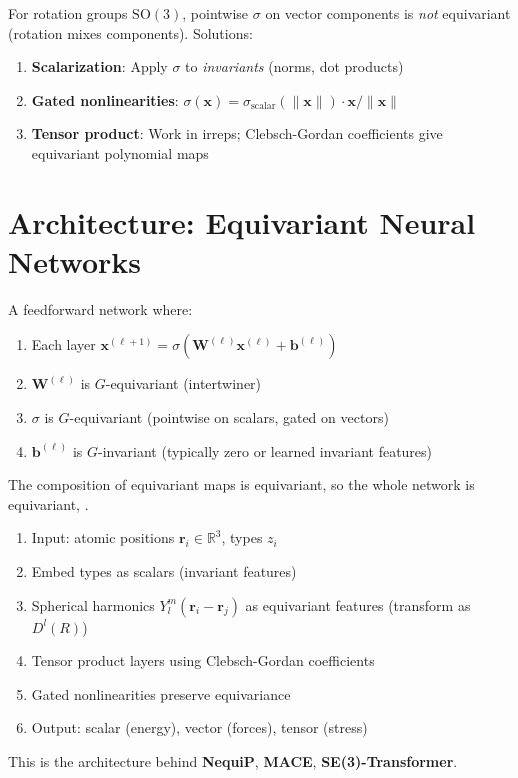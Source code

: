 For rotation groups $\mathrm{SO}(3)$, pointwise $\sigma$ on vector components is \emph{not} equivariant (rotation mixes components). Solutions: \cite{lim2023equivariant}
\begin{enumerate}
    \item \textbf{Scalarization}: Apply $\sigma$ to \emph{invariants} (norms, dot products)
    \item \textbf{Gated nonlinearities}: $\sigma(\bm{x}) = \sigma_{\text{scalar}}(\|\bm{x}\|) \cdot \bm{x}/\|\bm{x}\|$
    \item \textbf{Tensor product}: Work in irreps; Clebsch-Gordan coefficients give equivariant polynomial maps \cite{lim2023equivariant}
\end{enumerate}

\section{Architecture: Equivariant Neural Networks}
\label{sec:eq:arch}

\begin{definition}
A feedforward network where:
\begin{enumerate}
    \item Each layer $\bm{x}^{(\ell+1)} = \sigma(\bm{W}^{(\ell)} \bm{x}^{(\ell)} + \bm{b}^{(\ell)})$
    \item $\bm{W}^{(\ell)}$ is $G$-equivariant (intertwiner) \cite{lim2023equivariant}
    \item $\sigma$ is $G$-equivariant (pointwise on scalars, gated on vectors) \cite{lim2023equivariant}
    \item $\bm{b}^{(\ell)}$ is $G$-invariant (typically zero or learned invariant features)
\end{enumerate}
\end{definition}

The composition of equivariant maps is equivariant, so the whole network is equivariant, \cite{lim2023equivariant}.

\begin{example}
\begin{enumerate}
    \item Input: atomic positions $\bm{r}_i \in \mathbb{R}^3$, types $z_i$
    \item Embed types as scalars (invariant features)
    \item Spherical harmonics $Y_l^m(\bm{r}_i - \bm{r}_j)$ as equivariant features (transform as $D^l(R)$) \cite{lim2023equivariant}
    \item Tensor product layers using Clebsch-Gordan coefficients
    \item Gated nonlinearities preserve equivariance
    \item Output: scalar (energy), vector (forces), tensor (stress)
\end{enumerate}
This is the architecture behind \textbf{NequiP}, \textbf{MACE}, \textbf{SE(3)-Transformer}.
\end{example}

